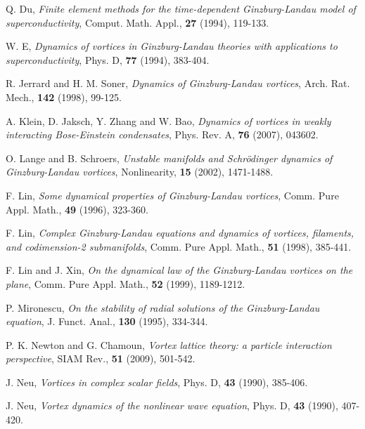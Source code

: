 \documentclass{aims}
\theoremstyle{plain}
\theoremstyle{definition}
\begin{document}
\begin{thebibliography}{99}
\newblock Q. Du,
\newblock \emph{Finite element methods for the time-dependent Ginzburg-Landau model of superconductivity},
\newblock Comput. Math. Appl., \textbf{27} (1994), 119-133.

\newblock W. E,
\newblock \emph{Dynamics of vortices in Ginzburg-Landau theories with applications to superconductivity},
\newblock Phys. D, \textbf{77} (1994), 383-404.

\newblock R. Jerrard and H. M. Soner,
\newblock \emph{Dynamics of Ginzburg-Landau vortices},
\newblock Arch. Rat. Mech., \textbf {142} (1998), 99-125.

\newblock A. Klein, D. Jaksch, Y. Zhang and W. Bao,
\newblock \emph{Dynamics of vortices in weakly interacting Bose-Einstein condensates},
\newblock Phys. Rev. A,  \textbf{76} (2007), 043602.

\newblock O. Lange and B. Schroers,
\newblock \emph{Unstable manifolds and Schr\"odinger dynamics of Ginzburg-Landau vortices},
\newblock Nonlinearity, \textbf{15} (2002), 1471-1488.

\newblock F. Lin,
\newblock \emph{Some dynamical properties of Ginzburg-Landau vortices},
\newblock  Comm. Pure Appl. Math., \textbf{49} (1996), 323-360.

\newblock F. Lin,
\newblock \emph{Complex Ginzburg-Landau equations and dynamics of vortices, filaments, and codimension-2 submanifolds},
\newblock Comm. Pure Appl. Math., \textbf{51} (1998), 385-441.

\newblock F. Lin and J. Xin,
\newblock \emph{On the dynamical law of the Ginzburg-Landau vortices on the plane},
\newblock  Comm. Pure Appl. Math., \textbf{52} (1999), 1189-1212.

\newblock P. Mironescu,
\newblock \emph{On the stability of radial solutions of the Ginzburg-Landau equation},
\newblock J. Funct. Anal., \textbf{130} (1995), 334-344.

\newblock P. K. Newton and G. Chamoun,
\newblock \emph{Vortex lattice theory: a particle interaction perspective},
\newblock SIAM Rev., \textbf{51} (2009), 501-542.

\newblock J. Neu,
\newblock \emph{Vortices in complex scalar fields},
\newblock Phys. D, \textbf{43} (1990), 385-406.

\newblock J. Neu,
\newblock \emph{Vortex dynamics of the nonlinear wave equation},
\newblock Phys. D, \textbf{43} (1990), 407-420.


\end{thebibliography}
\end{document}
